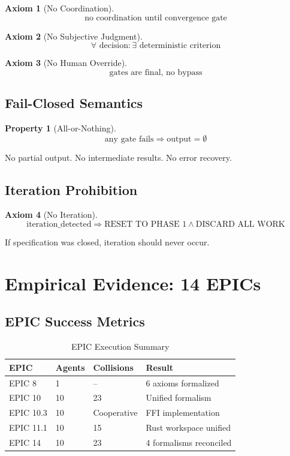 \documentclass[12pt,oneside,a4paper]{book}
\theoremstyle{definition}
\newtheorem{axiom}{Axiom}[chapter]
\newtheorem{property}{Property}[chapter]
\begin{document}
\begin{axiom}[No Coordination]
$$\text{no coordination until convergence gate}$$
\end{axiom}

\begin{axiom}[No Subjective Judgment]
$$\forall \text{ decision}: \exists \text{ deterministic criterion}$$
\end{axiom}

\begin{axiom}[No Human Override]
$$\text{gates are final, no bypass}$$
\end{axiom}

\section{Fail-Closed Semantics}
\label{sec:mega-prompt-fail-closed}

\begin{property}[All-or-Nothing]
$$\text{any gate fails} \Rightarrow \text{output} = \emptyset$$

No partial output. No intermediate results. No error recovery.
\end{property}

\section{Iteration Prohibition}
\label{sec:mega-prompt-iteration}

\begin{axiom}[No Iteration]
$$\text{iteration\_detected} \Rightarrow \text{RESET TO PHASE 1} \land \text{DISCARD ALL WORK}$$

If specification was closed, iteration should never occur.
\end{axiom}

\chapter{Empirical Evidence: 14 EPICs}
\label{ch:empirical}


\section{EPIC Success Metrics}
\label{sec:epic-metrics}

\begin{table}[h]
\centering
\begin{tabular}{llll}
\toprule
\textbf{EPIC} & \textbf{Agents} & \textbf{Collisions} & \textbf{Result} \\
\midrule
EPIC 8 & 1 & -- & 6 axioms formalized \\
EPIC 10 & 10 & 23 & Unified formalism \\
EPIC 10.3 & 10 & Cooperative & FFI implementation \\
EPIC 11.1 & 10 & 15 & Rust workspace unified \\
EPIC 14 & 10 & 23 & 4 formalisms reconciled \\
\bottomrule
\end{tabular}
\caption{EPIC Execution Summary}
\label{tab:epic-summary}
\end{table}
\end{document}
